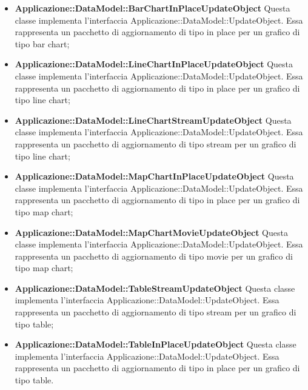 \begin{itemize}
		\item \textbf{Applicazione::DataModel::BarChartInPlaceUpdateObject} Questa classe implementa l'interfaccia Applicazione::DataModel::UpdateObject. Essa rappresenta un pacchetto di aggiornamento di tipo in place per un grafico di tipo bar chart;

		\item \textbf{Applicazione::DataModel::LineChartInPlaceUpdateObject} Questa classe implementa l'interfaccia Applicazione::DataModel::UpdateObject. Essa rappresenta un pacchetto di aggiornamento di tipo in place per un grafico di tipo line chart;

		\item \textbf{Applicazione::DataModel::LineChartStreamUpdateObject} Questa classe implementa l'interfaccia Applicazione::DataModel::UpdateObject. Essa rappresenta un pacchetto di aggiornamento di tipo stream per un grafico di tipo line chart;

		\item \textbf{Applicazione::DataModel::MapChartInPlaceUpdateObject} Questa classe implementa l'interfaccia Applicazione::DataModel::UpdateObject. Essa rappresenta un pacchetto di aggiornamento di tipo in place per un grafico di tipo map chart;

		\item \textbf{Applicazione::DataModel::MapChartMovieUpdateObject} Questa classe implementa l'interfaccia Applicazione::DataModel::UpdateObject. Essa rappresenta un pacchetto di aggiornamento di tipo movie per un grafico di tipo map chart;

		\item \textbf{Applicazione::DataModel::TableStreamUpdateObject} Questa classe implementa l'interfaccia Applicazione::DataModel::UpdateObject. Essa rappresenta un pacchetto di aggiornamento di tipo stream per un grafico di tipo table;

		\item \textbf{Applicazione::DataModel::TableInPlaceUpdateObject} Questa classe implementa l'interfaccia Applicazione::DataModel::UpdateObject. Essa rappresenta un pacchetto di aggiornamento di tipo in place per un grafico di tipo table.
	\end{itemize}